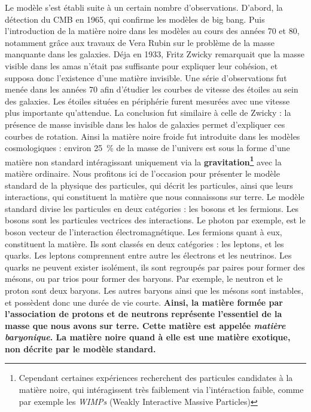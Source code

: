 \documentclass[11pt, twoside, a4paper, openright]{report}
\begin{document}
Le modèle s'est établi suite à un certain nombre d'observations. D'abord, la détection du CMB en 1965, qui confirme les modèles de big bang.
Puis l'introduction de la matière noire dans les modèles au cours des années 70 et 80, notamment grâce aux travaux de Vera Rubin sur le problème de la masse manquante dans les galaxies. Déja en 1933, Fritz Zwicky remarquait que la masse visible dans les amas n'était pas suffisante pour expliquer leur cohésion, et supposa donc l'existence d'une matière invisible. Une série d'observations fut menée dans les années 70 afin d'étudier les courbes de vitesse des étoiles au sein des galaxies. Les étoiles situées en périphérie furent mesurées avec une vitesse plus importante qu'attendue. La conclusion fut similaire à celle de Zwicky : la présence de masse invisible dans les halos de galaxies permet d'expliquer ces courbes de rotation. Ainsi la matière noire froide fut introduite dans les modèles cosmologiques :
environ \SI{25}{\percent} de la masse de l'univers est sous la forme d'une matière non standard intéragissant uniquement via la \textbf{gravitation\footnote{Cependant certaines expériences recherchent des particules candidates à la matière noire, qui intéragissent très faiblement via l'intéraction faible, comme par exemple les \emph{WIMPs} (Weakly Interactive Massive Particles)}} avec la matière ordinaire. Nous profitons ici de l'occasion pour présenter le modèle standard de la physique des particules, qui décrit les particules, ainsi que leurs interactions, qui constituent la matière que nous connaissons sur terre. Le modèle standard divise les particules en deux catégories : les bosons et les fermions. Les bosons sont les particules vectrices des interactions. Le photon par exemple, est le boson vecteur de l'interaction électromagnétique. Les fermions quant à eux, constituent la matière. Ils sont classés en deux catégories : les leptons, et les quarks. Les leptons comprennent entre autre les électrons et les neutrinos. Les quarks ne peuvent exister isolément, ils sont regroupés par paires pour former des mésons, ou par trios pour former des baryons. Par exemple, le neutron et le proton sont deux baryons. Les autres baryons ainsi que les mésons sont instables, et possèdent donc une durée de vie courte.
\textbf{
  Ainsi, la matière formée par l'association de protons et de neutrons représente l'essentiel de la masse que nous avons sur terre. Cette matière est appelée \emph{matière baryonique}.
La matière noire quand à elle est une matière exotique, non décrite par le modèle standard.
}
\end{document}

